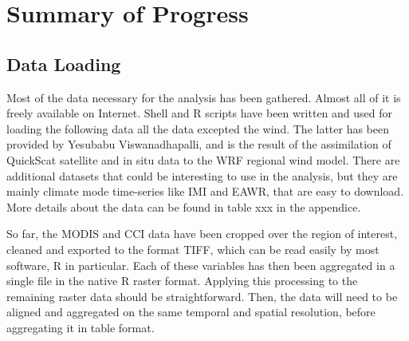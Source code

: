 \chapter{Summary of Progress}

\section{Data Loading}

Most of the data necessary for the analysis has been gathered. Almost all of it
is freely available on Internet. Shell and R scripts have been written and used
for loading the following data all the data excepted the wind. The latter has
been provided by Yesubabu Viswanadhapalli, and is the result of the
assimilation of QuickScat satellite and in situ data to the WRF regional wind
model. There are additional datasets that could be interesting to use in the
analysis, but they are mainly climate mode time-series like IMI and EAWR, that
are easy to download. More details about the data can be found in table xxx in
the appendice.

So far, the MODIS and CCI data have been cropped over the region of interest,
cleaned and exported to the format TIFF, which can be read easily by most
software, R in particular. Each of these variables has then been aggregated in
a single file in the native R raster format. Applying this processing to the
remaining raster data should be straightforward. Then, the data will need to be
aligned and aggregated on the same temporal and spatial resolution, before
aggregating it in table format.

